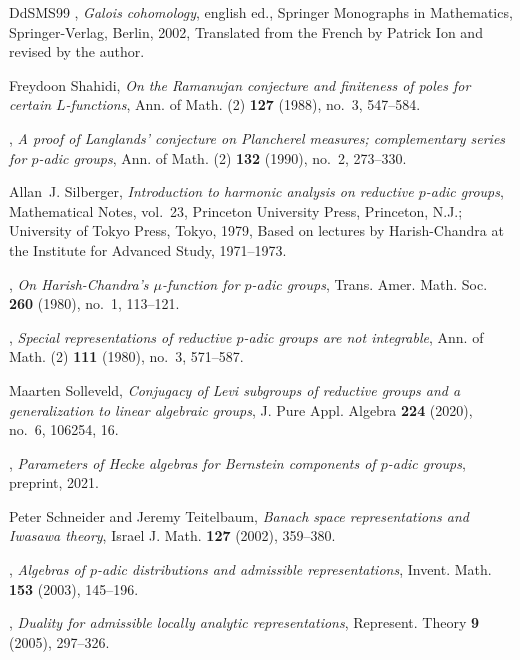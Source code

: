 \documentclass[a4paper]{amsart}
\numberwithin{equation}{section}
\theoremstyle{remark}
\theoremstyle{definition}
\begin{document}
\begin{thebibliography}{DdSMS99}
\bysame, \emph{Galois cohomology}, english ed., Springer Monographs in
  Mathematics, Springer-Verlag, Berlin, 2002, Translated from the French by
  Patrick Ion and revised by the author. 

Freydoon Shahidi, \emph{On the {R}amanujan conjecture and finiteness of poles
  for certain {$L$}-functions}, Ann. of Math. (2) \textbf{127} (1988), no.~3,
  547--584. 

\bysame, \emph{A proof of {L}anglands' conjecture on {P}lancherel measures;
  complementary series for {$p$}-adic groups}, Ann. of Math. (2) \textbf{132}
  (1990), no.~2, 273--330. 

Allan~J. Silberger, \emph{Introduction to harmonic analysis on reductive
  {$p$}-adic groups}, Mathematical Notes, vol.~23, Princeton University Press,
  Princeton, N.J.; University of Tokyo Press, Tokyo, 1979, Based on lectures by
  Harish-Chandra at the Institute for Advanced Study, 1971--1973. 

\bysame, \emph{On {H}arish-{C}handra's {$\mu $}-function for {$p$}-adic
  groups}, Trans. Amer. Math. Soc. \textbf{260} (1980), no.~1, 113--121.

\bysame, \emph{Special representations of reductive {$p$}-adic groups are not
  integrable}, Ann. of Math. (2) \textbf{111} (1980), no.~3, 571--587.

Maarten Solleveld, \emph{Conjugacy of {L}evi subgroups of reductive groups and
  a generalization to linear algebraic groups}, J. Pure Appl. Algebra
  \textbf{224} (2020), no.~6, 106254, 16. 

\bysame, \emph{Parameters of {H}ecke algebras for {B}ernstein components of
  {$p$}-adic groups}, preprint, 2021.

Peter Schneider and Jeremy Teitelbaum, \emph{Banach space representations and
  {I}wasawa theory}, Israel J. Math. \textbf{127} (2002), 359--380.

\bysame, \emph{Algebras of {$p$}-adic distributions and admissible
  representations}, Invent. Math. \textbf{153} (2003), 145--196. 

\bysame, \emph{Duality for admissible locally analytic representations},
  Represent. Theory \textbf{9} (2005), 297--326. 


\end{thebibliography}
\end{document}
